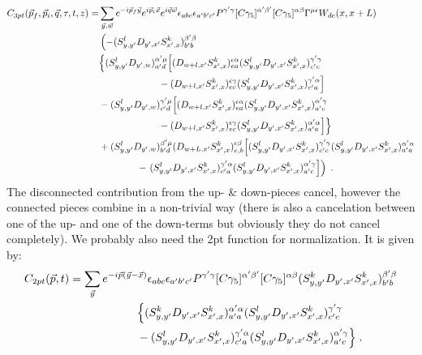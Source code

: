 \documentclass[a4paper,10pt]{scrartcl}
\begin{document}
\begin{align}
    C_{3pt}(\vec p_f, \vec p_i, \vec q, \tau, t, z) =& \sum_{\vec y, \vec w} e^{-i \vec p_f \vec y} e^{i \vec p_i \vec x} e^{i \vec q \vec w} \epsilon_{abc} \epsilon_{a'b'c'} \notag
    P^{\gamma' \gamma} [C \gamma_5]^{\alpha' \beta'} [C \gamma_5]^{\alpha \beta} \Gamma^{\mu \epsilon} W_{de}(x, x+L) \notag \\
    & \left( -(S_{y,y'}^l D_{y',x'}S^k_{x',x})^{\beta' \beta}_{b'b} \right. \notag \\
    &\Big\lbrace (S_{y,y'}^l D_{y',w})^{\alpha' \mu}_{a'd} \Big[ (D_{w+l,x'}S^k_{x',x})^{\epsilon \alpha}_{ea} (S_{y,y'}^l D_{y',x'}S^k_{x',x})^{\gamma' \gamma}_{c'c} \notag \\
    & \qquad \qquad \qquad \; - (D_{w+l,x'}S^k_{x',x})^{\epsilon \gamma}_{ec} (S_{y,y'}^l D_{y',x'}S^k_{x',x})^{\gamma' \alpha}_{c'a} \Big] \label{3pt_general} \\
    & -(S_{y,y'}^l D_{y',w})^{\gamma' \mu}_{c'd} \Big[ (D_{w+l,x'}S^k_{x',x})^{\epsilon \alpha}_{ea} (S_{y,y'}^l D_{y',x'}S^k_{x',x})^{\alpha' \gamma}_{a'c} \notag \\
    & \qquad \qquad \qquad \; - (D_{w+l,x'}S^k_{x',x})^{\epsilon \gamma}_{ec} (S_{y,y'}^l D_{y',x'}S^k_{x',x})^{\alpha' \alpha}_{a'a} \Big] \Big \rbrace\notag \\
    & + (S^l_{y,y'} D_{y',w})^{\beta'\mu}_{b'd} (D_{w+L,x'}S^k_{x',x})^{\epsilon \beta}_{e,b} \Big[ (S^l_{y,y'}D_{y',x'}S^k_{x',x})^{\gamma' \gamma}_{c'c}
    (S^l_{y,y'}D_{y',x'}S^k_{x',x})^{\alpha' \alpha}_{a'a} \notag \\
    & \qquad \qquad - \left. (S^l_{y,y'}D_{y',x'}S^k_{x',x})^{\gamma' \alpha}_{c'a} (S^l_{y,y'}D_{y',x'}S^k_{x',x})^{\alpha' \gamma}_{a'c} \Big] \right) \notag \; .
\end{align}
The disconnected contribution from the up- \& down-pieces cancel, however the connected pieces combine in a non-trivial way (there is also a cancelation
between one of the up- and one of the down-terms but obviously they do not cancel completely). 
We probably also need the 2pt function for normalization. It is given by:
\begin{align}
C_{2pt}(\vec p,t) &= \sum_{\vec y} e^{-i \vec p (\vec y - \vec x)} \epsilon_{abc} \epsilon_{a'b'c'} P^{\gamma' \gamma} [C \gamma_5]^{\alpha' \beta'} [C \gamma_5]^{\alpha \beta}
                    (S_{y,y'}^k D_{y',x'}S^k_{x',x})^{\beta' \beta}_{b'b} \notag \\
                & \qquad \qquad \qquad \Big \lbrace (S_{y,y'}^k D_{y',x'}S^k_{x',x})^{\alpha' \alpha}_{a'a} (S_{y,y'}^l D_{y',x'}S^k_{x',x})^{\gamma' \gamma}_{c'c} \\
                & \qquad \qquad \qquad -(S_{y,y'}^l D_{y',x'}S^k_{x',x})^{\gamma' \alpha}_{c'a} (S_{y,y'}^l D_{y',x'}S^k_{x',x})^{\alpha' \gamma}_{a'c} \Big \rbrace \notag \; .
\end{align}
\end{document}
